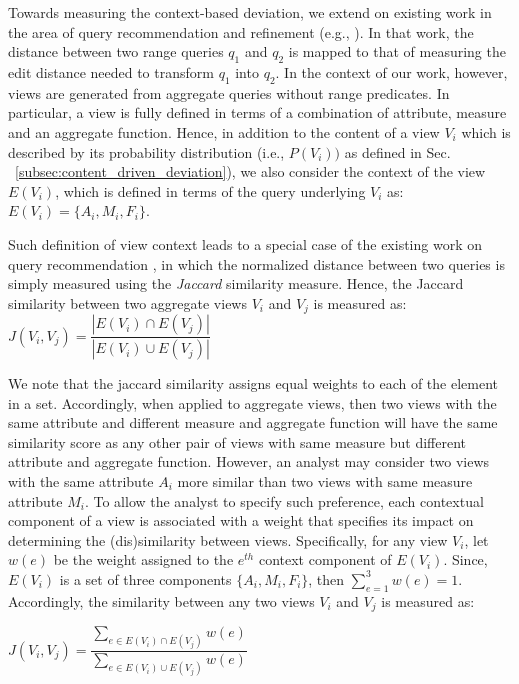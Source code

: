 %
Towards measuring the context-based deviation, we extend on existing work in the area of query recommendation and refinement (e.g., \cite{DBLP:conf/sigmod/TranC10,DBLP:conf/dexa/Kantere16,DBLP:conf/cikm/KantereOKS15,DBLP:journals/www/AlbarrakS17}).
%
In that work, the distance between two range queries $q_1$ and $q_2$ is mapped to that of measuring the edit distance needed to transform $q_1$ into $q_2$. %
%
In the context of our work, however, views are generated from aggregate queries without range predicates. 
%
In particular, a view is fully defined in terms of a combination of attribute, measure and an aggregate function.
%
Hence, in addition to the content of a view $V_i$ which is described by its probability distribution (i.e., $P(V_i))$ as defined in Sec. ~\ref{subsec:content_driven_deviation}), we also consider the context of the view $E(V_i)$, which is defined in terms of the query underlying $V_i$ as:
%
$E(V_{i})=  \{A_i, M_i, F_i\}$.




Such definition of view context leads to a special case of the existing work on query recommendation \cite{DBLP:conf/sigmod/TranC10,DBLP:conf/dexa/Kantere16,DBLP:conf/cikm/KantereOKS15}, in which the normalized distance between two queries is simply measured using the {\em Jaccard} similarity measure.
%
Hence, the Jaccard similarity between two aggregate views $V_i$ and $V_j$ is measured as: $ J\left (V_{i}, V_{j} \right) = \dfrac{| E(V_{i}) \cap E(V_{j}) |}{| E(V_{i}) \cup E(V_{j})|} $	

We note that the jaccard similarity assigns equal weights to each of the element in a set. 
%
Accordingly, when applied to aggregate views, then two views with the same attribute and different measure and aggregate function will have the same similarity score as any other pair of views with same measure but different attribute and aggregate function. 
%
However, an analyst may consider two views with the same attribute $A_i$ more similar than two views with same measure attribute $M_i$. 
%
To allow the analyst to specify such preference, each contextual component of a view is associated with a weight that specifies its impact on determining the (dis)similarity between views. 
%
Specifically, for any view $V_i$, let $w(e)$ be the weight assigned to the $e^{th}$ context component of $E(V_{i})$. 
%
Since, $E(V_{i})$ is a set of three components $\{A_i, M_i, F_i\}$, then $\sum_{e=1}^{3}w(e)=1$. 
%
%
Accordingly,  the similarity between any two views $V_i$ and $V_j$  is measured as:
\begin{center}
	$J(V_{i}, V_{j} ) = \dfrac{\sum_{e\in E(V_i) \cap E(V_j)}w(e)}{\sum_{e\in E(V_i) \cup E(V_j)}w(e)} $
\end{center}


